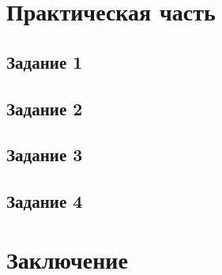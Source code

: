 \section{Практическая часть}
\subsection{Задание 1}
\subsection{Задание 2}

\subsection{Задание 3}
\subsection{Задание 4}


\section{Заключение}

 